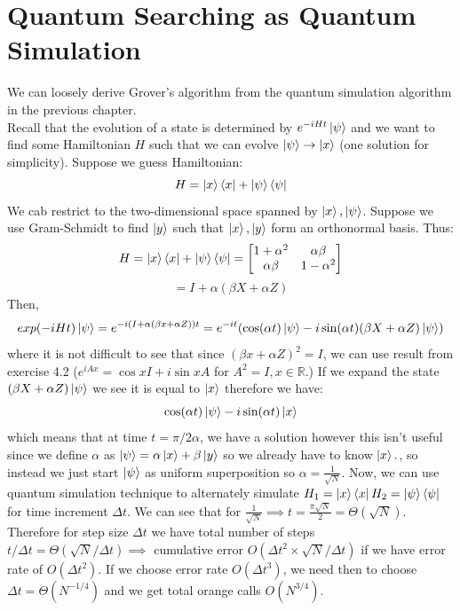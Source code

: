 \documentclass{article}
\begin{document}
\section{Quantum Searching as Quantum Simulation}
We can loosely derive Grover's algorithm from the quantum simulation algorithm in the previous chapter.\\
Recall that the evolution of a state is determined by $e^{-iHt}\ket{\psi}$ and we want to find some Hamiltonian $H$ such that we can evolve $\ket{\psi} \to \ket{x}$ (one solution for simplicity).
Suppose we guess Hamiltonian: $$H = \ket{x}\bra{x} + \ket{\psi}\bra{\psi}$$
We cab restrict to the two-dimensional space spanned by $\ket{x}, \ket{\psi}$. Suppose we use Gram-Schmidt to find $\ket{y}$ such that $\ket{x}, \ket{y}$ form an orthonormal basis. 
Thus:
$$H = \ket{x}\bra{x} + \ket{\psi}\bra{\psi} = \begin{bmatrix} 1 + \alpha^2 & \alpha\beta \\ \alpha\beta & 1- \alpha^2 \end{bmatrix}$$
$$= I+ \alpha(\beta X + \alpha Z)$$
Then, 
$$exp(-iHt)\ket{\psi} = e^{-i(I + \alpha(\beta x + \alpha Z))t} = e^{-it}(\cos (\alpha t) \ket{\psi} - i \sin(\alpha t) (\beta X + \alpha Z)\ket{\psi})$$
where it is not difficult to see that since $(\beta x + \alpha Z)^2 = I$, we can use result from exercise 4.2 ($e^{iAx} = \cos x I + i \sin x A$ for $A^2 = I, x \in \mathbb{R}$.) If we expand the state $(\beta X + \alpha Z)\ket{\psi}$ we see it is equal to $\ket{x}$ therefore we have:
$$\cos (\alpha t) \ket{\psi} - i \sin (\alpha t)\ket{x}$$
which means that at time $t= \pi/2\alpha$, we have a solution however this isn't useful since we define $\alpha$ as $\ket{\psi}= \alpha \ket{x} + \beta\ket{y}$ so we already have to know $\ket{x}.$, so instead we just start $\ket{\psi}$ as uniform superposition so $\alpha = \frac{1}{\sqrt{N}}$. Now, we can use quantum simulation technique to alternately simulate $H_1 = \ket{x}\bra{x} H_2 = \ket{\psi}\bra{\psi}$ for time increment $\Delta t$. We can see that for $\frac{1}{\sqrt{N}} \implies t=\frac{\pi \sqrt{N}}{2} = \Theta(\sqrt{N})$. Therefore for step size $\Delta t$ we have total number of steps $t/\Delta t = \Theta(\sqrt{N}/\Delta t) \implies$ cumulative error $O(\Delta t^2 \times \sqrt{N}/\Delta t)$ if we have error rate of $O(\Delta t^2)$. If we choose error rate $O(\Delta t^3)$, we need then to choose $\Delta t = \Theta(N^{-1/4})$ and we get total orange calls $O(N^{3/4})$.\\
\end{document}
